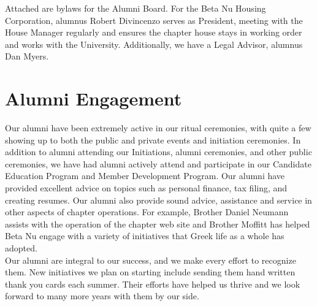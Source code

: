    Attached are bylaws for the Alumni Board. For the Beta Nu Housing Corporation, alumnus Robert Divincenzo serves as President, meeting with the House Manager regularly and ensures the chapter house stays in working order and works with the University. Additionally, we have a Legal Advisor, alumnus Dan Myers. 
    
  \section*{Alumni Engagement}
    Our alumni have been extremely active in our ritual ceremonies, with quite a few showing up to both the public and private events and initiation ceremonies. In addition to alumni attending our Initiations, alumni ceremonies, and other public ceremonies, we have had alumni actively attend and participate in our Candidate Education Program and Member Development Program. Our alumni have provided excellent advice on topics such as personal finance, tax filing, and creating resumes. Our alumni also provide sound advice, assistance and service in other aspects of chapter operations. For example, Brother Daniel Neumann assists with the operation of the chapter web site and Brother Moffitt has helped Beta Nu engage with a variety of initiatives that Greek life as a whole has adopted.  \\

    Our alumni are integral to our success, and we make every effort to recognize them. New initiatives we plan on starting include sending them hand written thank you cards each summer. Their efforts have helped us thrive and we look forward to many more years with them by our side.